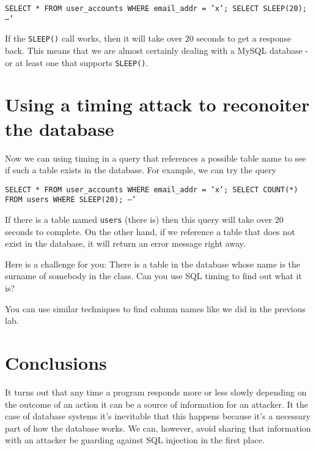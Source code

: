 \documentclass{article}
\begin{document}
\texttt{SELECT * FROM user\_accounts WHERE email\_addr = '{\color{red}x'; SELECT SLEEP(20); --}' }

If the \texttt{SLEEP()} call works, then it will take over 20 seconds to get a response back.  This means that we are almost certainly dealing with a MySQL database - or at least one that supports \texttt{SLEEP()}.

\section{Using a timing attack to reconoiter the database}

Now we can using timing in a query that references a possible table name to see if such a table exists in the database.  For example, we can try the query 

\texttt{SELECT * FROM user\_accounts WHERE email\_addr = '{\color{red}x'; SELECT COUNT(*) FROM users WHERE SLEEP(20); --}' }

If there is a table named \texttt{users} (there is) then this query will take over 20 seconds to complete.  On the other hand, if we reference a table that does not exist in the database, it will return an error message right away.

Here is a challenge for you:  There is a table in the database whose name is the surname of somebody in the class.  Can you use SQL timing to find out what it is?

You can use similar techniques to find column names like we did in the previous lab.


\section{Conclusions}

It turns out that any time a program responds more or less slowly depending on the outcome of an action it can be a source of information for an attacker. It the case of database systems it's inevitable that this happens because it's a necessary part of how the database works. We can, however, avoid sharing that information with an attacker be guarding against SQL injection in the first place.
\end{document}
